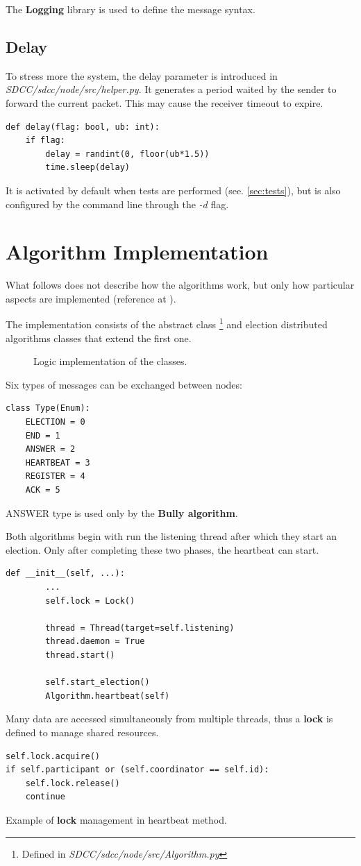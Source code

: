 \documentclass[conference]{IEEEtran}
\begin{document}
The \textbf{Logging} library is used to define the message syntax.

\subsection{Delay}\label{delay}

To stress more the system, the delay parameter is introduced in \textit{SDCC/sdcc/node/src/helper.py}. It generates a period waited by the sender to forward the current packet. This may cause the receiver timeout to expire.
\begin{lstlisting}
def delay(flag: bool, ub: int):
    if flag:
        delay = randint(0, floor(ub*1.5))
        time.sleep(delay)
\end{lstlisting}
It is activated by default when tests are performed (see. \ref{sec:tests}), but is also configured by the command line through the \textit{-d} flag.

\section{Algorithm Implementation}

What follows does not describe how the algorithms work, but only how particular aspects are implemented (reference at \cite{coulouris2005distributed}).

The implementation consists of the abstract class \footnote{Defined in \textit{SDCC/sdcc/node/src/Algorithm.py}} and election distributed algorithms classes that extend the first one. 

\begin{figure}[htbp]
  \centering
  
  \caption{Logic implementation of the classes.}
\end{figure}

Six types of messages can be exchanged between nodes:

\begin{lstlisting}
class Type(Enum):
    ELECTION = 0
    END = 1
    ANSWER = 2
    HEARTBEAT = 3
    REGISTER = 4
    ACK = 5
\end{lstlisting}
ANSWER type is used only by the \textbf{Bully algorithm}.

Both algorithms begin with run the listening thread after which they start an election. Only after completing these two phases, the heartbeat can start. 
\begin{lstlisting}
def __init__(self, ...):
        ...
        self.lock = Lock()
        
        thread = Thread(target=self.listening)
        thread.daemon = True
        thread.start()

        self.start_election()
        Algorithm.heartbeat(self)
\end{lstlisting}
Many data are accessed simultaneously from multiple threads, thus a \textbf{lock} is defined to manage shared resources.
\begin{lstlisting}
self.lock.acquire()
if self.participant or (self.coordinator == self.id):
    self.lock.release()
    continue
\end{lstlisting}\caption{Example of \textbf{lock} management in heartbeat method.}
\end{document}
